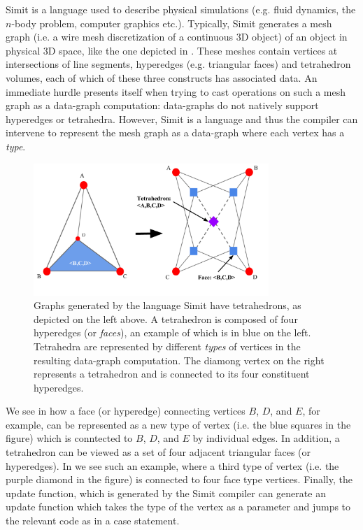 Simit is a language used to describe physical simulations 
(e.g. fluid dynamics, the $n$-body problem, computer graphics etc.).
Typically, Simit generates a mesh graph (i.e. a wire mesh discretization
of a continuous 3D object) of an object in 
physical 3D space, like the one depicted in .  
These meshes contain vertices at intersections of line segments, 
hyperedges (e.g. triangular faces) and tetrahedron volumes, each of which of
these three constructs has associated data.  An immediate hurdle
presents itself when trying to cast operations on such a mesh graph
as a data-graph computation: data-graphs do not natively support
hyperedges or tetrahedra.  However, Simit is a language and thus
the compiler can intervene to represent the mesh graph as a data-graph
where each vertex has a \emph{type}.  

\begin{figure}[]
\centering
\includegraphics[width=3.5in]{figures/tetrahedron.pdf}
\caption{Graphs generated by the language Simit have tetrahedrons,
as depicted on the left above.  A tetrahedron is composed of four
hyperedges (or \emph{faces}), an example
of which is in blue on the left.  Tetrahedra are represented by different
\emph{types} of vertices in the resulting data-graph computation.
The diamong vertex on the right represents a tetrahedron and is 
connected to its four constituent hyperedges.}
\label{fig:tetrahedron}
\end{figure}



We see in 
how a face (or hyperedge) connecting vertices $B$, $D$, and $E$, for example, 
can be represented as a new type of vertex (i.e. the blue squares
in the figure) which is conntected to $B$, $D$, and
$E$ by individual edges.  In addition, a tetrahedron can be 
viewed as a set of four adjacent triangular faces (or hyperedges).  In 
 we see such an example, where a third type
of vertex (i.e. the purple diamond in the figure) is connected 
to four face type vertices.  Finally, the update function, which
is generated by the Simit compiler can generate an update function
which takes the type of the vertex as a parameter and jumps
to the relevant code as in a case statement.


